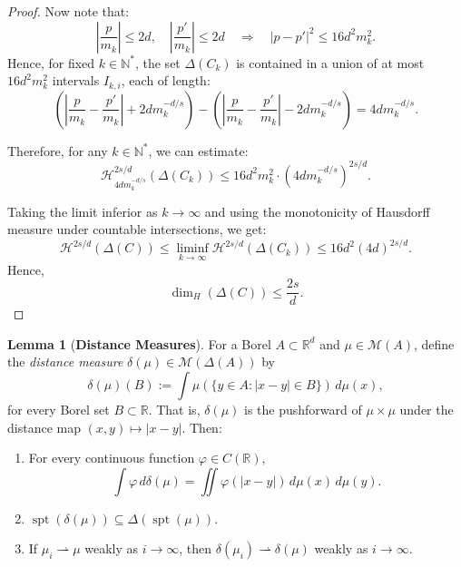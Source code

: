 \documentclass[12pt,a4paper]{report}
\theoremstyle{definition}
\newtheorem{lemma}{Lemma}
\begin{document}
\begin{proof}
Now note that:
\[
\left| \frac{p}{m_k} \right| \le 2d, \quad \left| \frac{p'}{m_k} \right| \le 2d
\quad \Rightarrow \quad |p - p'|^2 \le 16d^2 m_k^2.
\]
Hence, for fixed \( k \in \mathbb{N}^* \), the set \( \Delta(C_k) \) is contained in a union of at most \( 16d^2 m_k^2 \) intervals \( I_{k,i} \), each of length:
\[
\left( \left| \frac{p}{m_k} - \frac{p'}{m_k} \right| + 2d m_k^{-d/s} \right) - \left( \left| \frac{p}{m_k} - \frac{p'}{m_k} \right| - 2d m_k^{-d/s} \right) = 4d m_k^{-d/s}.
\]

Therefore, for any \( k \in \mathbb{N}^* \), we can estimate:
\[
\mathcal{H}_{4d m_k^{-d/s}}^{2s/d}(\Delta(C_k)) \le 16d^2 m_k^2 \cdot \left(4d m_k^{-d/s} \right)^{2s/d}.
\]

Taking the limit inferior as \( k \to \infty \) and using the monotonicity of Hausdorff measure under countable intersections, we get:
\[
\mathcal{H}^{2s/d}(\Delta(C)) \le \liminf_{k \to \infty} \mathcal{H}^{2s/d}(\Delta(C_k)) \le 16d^2 (4d)^{2s/d}.
\]
Hence,
\[
\dim_H(\Delta(C)) \le \frac{2s}{d}.
\]

\end{proof}

\begin{lemma}[\textbf{Distance Measures}]
For a Borel $A \subset \mathbb{R}^d$ and \( \mu \in \mathcal{M}(A) \), define the \emph{distance measure} \( \delta(\mu) \in \mathcal{M}(\Delta(A)) \) by
\[
\delta(\mu)(B) := \int \mu\left( \{ y \in A : |x - y| \in B \} \right) \, d\mu(x),
\]
for every Borel set \( B \subset \mathbb{R} \). That is, \( \delta(\mu) \) is the pushforward of \( \mu \times \mu \) under the distance map \( (x, y) \mapsto |x - y| \). Then:
\begin{enumerate}
    \item For every continuous function \( \varphi \in C(\mathbb{R}) \),
    \[
    \int \varphi \, d\delta(\mu) = \iint \varphi(|x - y|) \, d\mu(x) \, d\mu(y).
    \]

    \item $\operatorname{spt}(\delta(\mu)) \subseteq \Delta(\operatorname{spt}(\mu)).$ \label{sptdist}

    \item If \( \mu_i \rightharpoonup \mu \) weakly as \( i \to \infty \), then \( \delta(\mu_i) \rightharpoonup \delta(\mu) \) weakly as \( i \to \infty \).
\end{enumerate}
\end{lemma}
\end{document}
